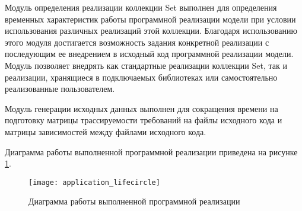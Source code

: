 Модуль определения реализации коллекции Set выполнен для определения временных характеристик работы программной реализации модели при условии использования различных реализаций этой коллекции. Благодаря использованию этого модуля достигается возможность задания конкретной реализации с последующим ее внедрением в исходный код программной реализации модели. Модуль позволяет внедрять как стандартные реализации коллекции Set, так и реализации, хранящиеся в подключаемых библиотеках или самостоятельно реализованные пользователем.

Модуль генерации исходных данных выполнен для сокращения времени на подготовку матрицы трассируемости требований на файлы исходного кода и матрицы зависимостей между файлами исходного кода.

Диаграмма работы выполненной программной реализации приведена на рисунке \ref{fig:application_lifecircle}.

\begin{figure}[H]
    \centering
    \texttt{[image: application\_lifecircle]}
    \caption{Диаграмма работы выполненной программной реализации}
    \label{fig:application_lifecircle}
\end{figure}